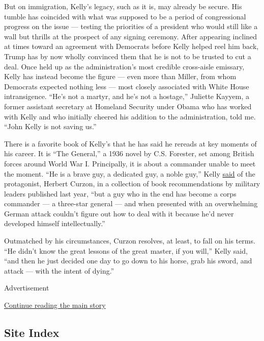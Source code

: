 But on immigration, Kelly's legacy, such as it is, may already be
secure. His tumble has coincided with what was supposed to be a period
of congressional progress on the issue --- testing the priorities of a
president who would still like a wall but thrills at the prospect of any
signing ceremony. After appearing inclined at times toward an agreement
with Democrats before Kelly helped reel him back, Trump has by now
wholly convinced them that he is not to be trusted to cut a deal. Once
held up as the administration's most credible cross-aisle emissary,
Kelly has instead become the figure --- even more than Miller, from whom
Democrats expected nothing less --- most closely associated with White
House intransigence. ``He's not a martyr, and he's not a hostage,''
Juliette Kayyem, a former assistant secretary at Homeland Security under
Obama who has worked with Kelly and who initially cheered his addition
to the administration, told me. ``John Kelly is not saving us.''

There is a favorite book of Kelly's that he has said he rereads at key
moments of his career. It is ``The General,'' a 1936 novel by C.S.
Forester, set among British forces around World War I. Principally, it
is about a commander unable to meet the moment. ``He is a brave guy, a
dedicated guy, a noble guy,'' Kelly
\href{http://foreignpolicy.com/2017/07/31/homeland-security-secretary-john-kelly-discusses-c-s-foresters-the-general-2/}{said}
of the protagonist, Herbert Curzon, in a collection of book
recommendations by military leaders published last year, ``but a guy who
in the end has become a corps commander --- a three-star general --- and
when presented with an overwhelming German attack couldn't figure out
how to deal with it because he'd never developed himself
intellectually.''

Outmatched by his circumstances, Curzon resolves, at least, to fall on
his terms. ``He didn't know the great lessons of the great master, if
you will,'' Kelly said, ``and then he just decided one day to go down to
his horse, grab his sword, and attack --- with the intent of dying.''

Advertisement

\protect\hyperlink{after-bottom}{Continue reading the main story}

\hypertarget{site-index}{%
\subsection{Site Index}\label{site-index}}

